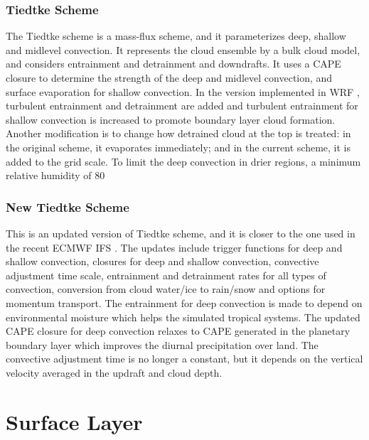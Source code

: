 \subsubsection{Tiedtke Scheme}

The Tiedtke scheme is a mass-flux scheme, and it parameterizes deep, 
shallow and midlevel convection. It represents the cloud ensemble by a bulk cloud model, 
and considers entrainment and detrainment and downdrafts. It uses a CAPE closure to 
determine the strength of the deep and midlevel convection, and surface evaporation 
for shallow convection. In the version implemented in WRF \citep{zhangc11}, turbulent 
entrainment and detrainment are added and turbulent entrainment for shallow convection 
is increased to promote boundary layer cloud formation. Another modification is to change 
how detrained cloud at the top is treated: in the original scheme, it evaporates immediately; 
and in the current scheme, it is added to the grid scale. To limit the deep convection in 
drier regions, a minimum relative humidity of 80%

\subsubsection{New Tiedtke Scheme}

This is an updated version of Tiedtke scheme, and it is closer to the one used in the 
recent ECMWF IFS \citep{zhangc17}. The updates include trigger functions for deep and shallow convection, 
closures for deep and shallow convection, convective adjustment time scale, entrainment 
and detrainment rates for all types of convection, conversion from cloud water/ice to 
rain/snow and options for momentum transport. The entrainment for deep convection is 
made to depend on environmental moisture which helps the simulated tropical systems. 
The updated CAPE closure for deep convection relaxes to CAPE generated in the planetary 
boundary layer which improves the diurnal precipitation over land. The convective 
adjustment time is no longer a constant, but it depends on the vertical velocity averaged 
in the updraft and cloud depth.


\section{Surface Layer}

